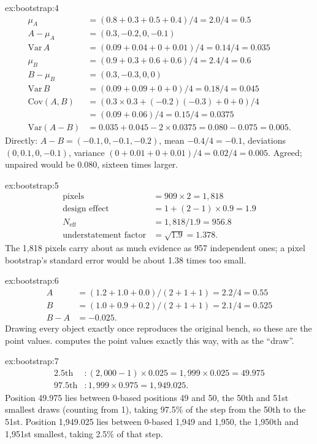 \begin{solution}{ex:bootstrap:4}
\begin{align*}
\mu_A &= (0.8 + 0.3 + 0.5 + 0.4)/4 = 2.0/4 = 0.5\\
A - \mu_A &= (0.3, -0.2, 0, -0.1)\\
\mathrm{Var}\,A &= (0.09 + 0.04 + 0 + 0.01)/4 = 0.14/4 = 0.035\\
\mu_B &= (0.9 + 0.3 + 0.6 + 0.6)/4 = 2.4/4 = 0.6\\
B - \mu_B &= (0.3, -0.3, 0, 0)\\
\mathrm{Var}\,B &= (0.09 + 0.09 + 0 + 0)/4 = 0.18/4 = 0.045\\
\mathrm{Cov}(A, B) &= (0.3 \times 0.3 + (-0.2)(-0.3) + 0 + 0)/4\\
&= (0.09 + 0.06)/4 = 0.15/4 = 0.0375\\
\mathrm{Var}(A - B) &= 0.035 + 0.045 - 2 \times 0.0375 = 0.080 - 0.075 = 0.005.
\end{align*}
Directly: $A - B = (-0.1, 0, -0.1, -0.2)$, mean $-0.4/4 = -0.1$, deviations $(0, 0.1, 0, -0.1)$, variance
$(0 + 0.01 + 0 + 0.01)/4 = 0.02/4 = 0.005$. Agreed; unpaired would be $0.080$, sixteen times larger.
\end{solution}

\begin{solution}{ex:bootstrap:5}
\begin{align*}
\text{pixels} &= 909 \times 2 = 1{,}818\\
\text{design effect} &= 1 + (2 - 1) \times 0.9 = 1.9\\
N_{\text{eff}} &= 1{,}818 / 1.9 = 956.8\\
\text{understatement factor} &= \sqrt{1.9} = 1.378.
\end{align*}
The 1,818 pixels carry about as much evidence as 957 independent ones; a pixel bootstrap's standard error would be about
1.38 times too small.
\end{solution}

\begin{solution}{ex:bootstrap:6}
\begin{align*}
A &= (1.2 + 1.0 + 0.0)/(2 + 1 + 1) = 2.2/4 = 0.55\\
B &= (1.0 + 0.9 + 0.2)/(2 + 1 + 1) = 2.1/4 = 0.525\\
B - A &= -0.025.
\end{align*}
Drawing every object exactly once reproduces the original bench, so these are the point values. 
computes the point values exactly this way, with  as the ``draw''.
\end{solution}

\begin{solution}{ex:bootstrap:7}
\begin{align*}
\text{2.5th} &: (2{,}000 - 1) \times 0.025 = 1{,}999 \times 0.025 = 49.975\\
\text{97.5th} &: 1{,}999 \times 0.975 = 1{,}949.025.
\end{align*}
Position 49.975 lies between 0-based positions 49 and 50, the 50th and 51st smallest draws (counting from 1), taking
97.5\% of the step from the 50th to the 51st. Position 1,949.025 lies between 0-based 1,949 and 1,950, the 1,950th and
1,951st smallest, taking 2.5\% of that step.
\end{solution}
